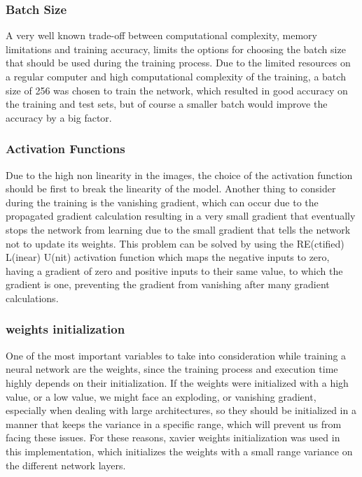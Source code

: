 \documentclass{article}
\begin{document}
\begin{adjustwidth}{-40pt}{-40pt}
\subsubsection{Batch Size}
A very well known trade-off between computational complexity, memory limitations and training accuracy, limits the options for choosing the batch size that should be used during the training process. Due to the limited resources on a regular computer and high computational complexity of the training, a batch size of 256 was chosen to train the network, which resulted in good accuracy on the training and test sets, but of course a smaller batch would improve the accuracy by a big factor.

\subsubsection{Activation Functions}
Due to the high non linearity in the images, the choice of the activation function should be first to break the linearity of the model. Another thing to consider during the training is the vanishing gradient, which can occur due to the propagated gradient calculation resulting in a very small gradient that eventually stops the network from learning due to the small gradient that tells the network not to update its weights. This problem can be solved by using the RE(ctified) L(inear) U(nit) activation function which maps the negative inputs to zero, having a gradient of zero and positive inputs to their same value, to which the gradient is one, preventing the gradient from vanishing after many gradient calculations.

\subsubsection{weights initialization}
One of the most important variables to take into consideration while training a neural network are the weights, since the training process and execution time highly depends on their initialization. If the weights were initialized with a high value, or a low value, we might face an exploding, or vanishing gradient, especially when dealing with large architectures, so they should be initialized in a manner that keeps the variance in a specific range, which will prevent us from facing these issues. For these reasons, xavier weights initialization \cite{Glorot10understandingthe} was used in this implementation, which initializes the weights with a small range variance on the different network layers.


\end{adjustwidth}
\end{document}
